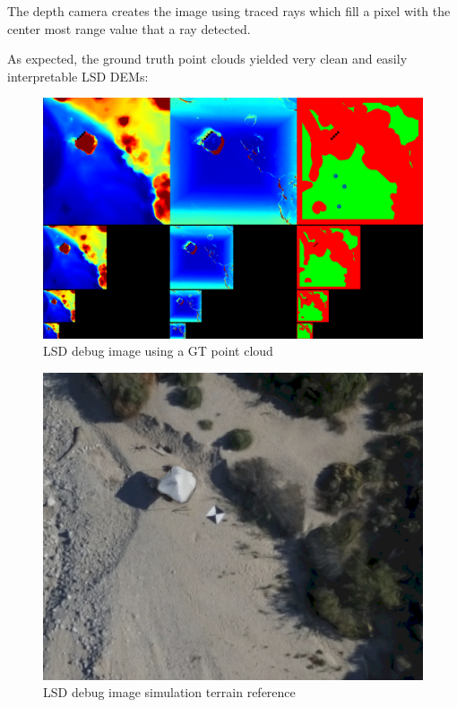 The depth camera creates the image using traced rays which fill a pixel with the center most range value that a ray detected.

As expected, the ground truth point clouds yielded very clean and easily interpretable LSD DEMs:

\begin{figure}[h]
\centering
\includegraphics[scale=0.25]{images/methodology/lsd_debug_image.png}
\caption{LSD debug image using a GT point cloud}
\label{fig:gt_lsd_debug}
\end{figure}

\begin{figure}[h]
\centering
\includegraphics[scale=0.25]{images/methodology/lsd_debug_reference.png}
\caption{LSD debug image simulation terrain reference}
\label{fig:gt_lsd_debug_reference}
\end{figure}
\clearpage %

